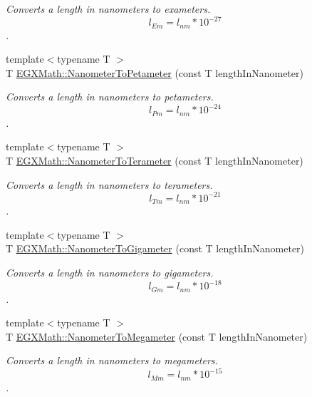 \begin{DoxyCompactItemize}
\begin{DoxyCompactList}\small\item\em Converts a length in nanometers to exameters. \[ l_{Em}=l_{nm} * 10^{-27} \]. \end{DoxyCompactList}\item 
{\footnotesize template$<$typename T $>$ }\\T \mbox{\hyperlink{group___e_g_x_math-_conversions-_length_conversions-_nanometer-_s_i_ga61c4ec1200cb2e909920c108d676d6e6}{E\+G\+X\+Math\+::\+Nanometer\+To\+Petameter}} (const T length\+In\+Nanometer)
\begin{DoxyCompactList}\small\item\em Converts a length in nanometers to petameters. \[ l_{Pm}=l_{nm} * 10^{-24} \]. \end{DoxyCompactList}\item 
{\footnotesize template$<$typename T $>$ }\\T \mbox{\hyperlink{group___e_g_x_math-_conversions-_length_conversions-_nanometer-_s_i_gacca577403e34659fd6bccf40885704fc}{E\+G\+X\+Math\+::\+Nanometer\+To\+Terameter}} (const T length\+In\+Nanometer)
\begin{DoxyCompactList}\small\item\em Converts a length in nanometers to terameters. \[ l_{Tm}=l_{nm} * 10^{-21} \]. \end{DoxyCompactList}\item 
{\footnotesize template$<$typename T $>$ }\\T \mbox{\hyperlink{group___e_g_x_math-_conversions-_length_conversions-_nanometer-_s_i_ga235d244736444af6437d9086ae1f485d}{E\+G\+X\+Math\+::\+Nanometer\+To\+Gigameter}} (const T length\+In\+Nanometer)
\begin{DoxyCompactList}\small\item\em Converts a length in nanometers to gigameters. \[ l_{Gm}=l_{nm} * 10^{-18} \]. \end{DoxyCompactList}\item 
{\footnotesize template$<$typename T $>$ }\\T \mbox{\hyperlink{group___e_g_x_math-_conversions-_length_conversions-_nanometer-_s_i_gabe3584b4139cea97ebc372abf99fc63e}{E\+G\+X\+Math\+::\+Nanometer\+To\+Megameter}} (const T length\+In\+Nanometer)
\begin{DoxyCompactList}\small\item\em Converts a length in nanometers to megameters. \[ l_{Mm}=l_{nm} * 10^{-15} \]. \end{DoxyCompactList}\item 

\end{DoxyCompactItemize}
